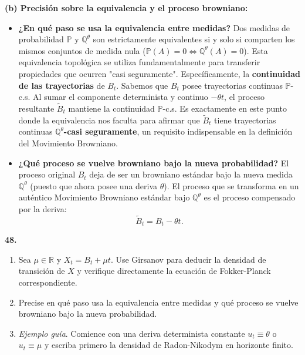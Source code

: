 \documentclass[11pt, letterpaper]{article}
\begin{document}
\begin{solucion}
    \vspace{3mm}
    \textbf{(b) Precisión sobre la equivalencia y el proceso browniano:}
    \begin{itemize}
        \item \textbf{¿En qué paso se usa la equivalencia entre medidas?} Dos medidas de probabilidad $\mathbb{P}$ y $\mathbb{Q}^\theta$ son estrictamente equivalentes si y solo si comparten los mismos conjuntos de medida nula ($\mathbb{P}(A)=0 \iff \mathbb{Q}^\theta(A)=0$). Esta equivalencia topológica se utiliza fundamentalmente para transferir propiedades que ocurren "casi seguramente". Específicamente, la \textbf{continuidad de las trayectorias} de $B_t$. Sabemos que $B_t$ posee trayectorias continuas $\mathbb{P}$-c.s. Al sumar el componente determinista y continuo $-\theta t$, el proceso resultante $\tilde{B}_t$ mantiene la continuidad $\mathbb{P}$-c.s. Es exactamente en este punto donde la equivalencia nos faculta para afirmar que $\tilde{B}_t$ tiene trayectorias continuas \textbf{$\mathbb{Q}^\theta$-casi seguramente}, un requisito indispensable en la definición del Movimiento Browniano.
        \item \textbf{¿Qué proceso se vuelve browniano bajo la nueva probabilidad?} El proceso original $B_t$ deja de ser un browniano estándar bajo la nueva medida $\mathbb{Q}^\theta$ (puesto que ahora posee una deriva $\theta$). El proceso que se transforma en un auténtico Movimiento Browniano estándar bajo $\mathbb{Q}^\theta$ es el proceso compensado por la deriva:
        \[ \tilde{B}_t = B_t - \theta t. \]
    \end{itemize}
\end{solucion}

\newpage

\begin{ejercicio}
    \textbf{48.} 
    \begin{enumerate}
        \item[(a)] Sea $\mu \in \mathbb{R}$ y $X_t = B_t + \mu t$. Use Girsanov para deducir la densidad de transición de $X$ y verifique directamente la ecuación de Fokker-Planck correspondiente.
        \item[(b)] Precise en qué paso usa la equivalencia entre medidas y qué proceso se vuelve browniano bajo la nueva probabilidad.
        \item[(c)] \textit{Ejemplo guía}. Comience con una deriva determinista constante $u_t \equiv \theta$ o $u_t \equiv \mu$ y escriba primero la densidad de Radon-Nikodym en horizonte finito.
    \end{enumerate}
\end{ejercicio}
\end{document}
